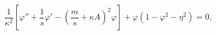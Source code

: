 \begin{equation}\label{eq1}
 \frac{1}{\kappa^2} \left[ \varphi'' + \frac{1}{s}\varphi' 
- \left(\frac{m}{s} +\kappa A
\right)^2\varphi \right] +\varphi(1-\varphi^2 -\eta^2)=0,
\end{equation}

